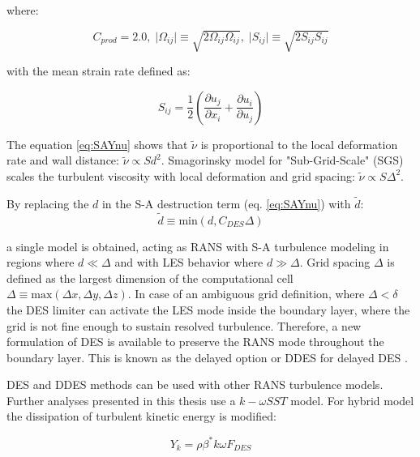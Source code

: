 \noindent where:

\begin{equation} \label{eq:SAdeform3}
C_{prod} = 2.0, \;
\lvert \Omega_{ij} \rvert \equiv \sqrt{2 \Omega_{ij} \Omega_{ij}}, \;
\lvert S_{ij} \rvert \equiv \sqrt{2 S_{ij} S_{ij}}
\end{equation}

\noindent with the mean strain rate defined as:

\begin{equation} \label{eq:SAdeform4}
S_{ij} = \frac{1}{2} \left( \frac{\partial u_j}{\partial x_i} + \frac{\partial u_i}{\partial u_j}\right)
\end{equation}

The equation \ref{eq:SAYnu} shows that $\tilde{\nu}$ is proportional to the local deformation rate and wall distance: $\tilde{\nu} \propto Sd^2$. Smagorinsky model for "Sub-Grid-Scale" (SGS) scales the turbulent viscosity with local deformation and grid spacing: $\tilde{\nu} \propto S \Delta^2$.

By replacing the $d$ in the S-A destruction term (eq. \ref{eq:SAYnu}) with $\tilde{d}$:
\begin{equation} \label{eq:tilded}
\tilde{d} \equiv \text{min} \left(d, C_{DES} \Delta \right)
\end{equation}

\noindent a single model is obtained, acting as RANS with S-A turbulence modeling in regions where $d \ll \Delta$ and with LES behavior where $d \gg \Delta$. Grid spacing $\Delta$ is defined as the largest dimension of the computational cell $\Delta \equiv \text{max}\left( \Delta x, \Delta y, \Delta z\right)$.  In case of an ambiguous grid definition, where $\Delta < \delta$ the DES limiter can activate the LES mode inside the boundary layer, where the grid is not fine enough to sustain resolved turbulence. Therefore, a new formulation \citep{ddesspalart} of DES is available to preserve the RANS mode throughout the boundary layer. This is known as the delayed option or DDES for delayed DES \citep{fluenttheory}.

DES and DDES methods can be used with other RANS turbulence models. Further analyses presented in this thesis use a $k-\omega SST$ model. For hybrid model the dissipation of turbulent kinetic energy is modified:

\begin{equation} \label{eq:deskoYk}
Y_k = \rho \beta^{*} k \omega F_{DES}
\end{equation}

